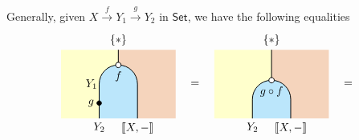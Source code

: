 Generally, given $X\xrightarrow{f}Y_1\xrightarrow{g}Y_2$ in $\mathsf{Set}$, we have the following equalities
\[
 \begin{tikzpicture}[x=0.6cm,y=0.6cm,line width=0.7pt,hollow/.style={
            circle,
            fill=white,
            draw,
            outer sep=0pt,
            inner sep=1.7pt,
            line width=0.7pt
          }]
    \definecolor{leftcolor}{RGB}{255,255,204}
    \definecolor{midcolor}{HTML}{BBE6FB}
    \definecolor{rightcolor}{HTML}{F5D4BC}

    \node at (4, 1.8) {$=$};
    \node at (12, 1.8) {$=$};
    
    \begin{scope}
        \begin{scope} 
            \clip (-3,0) rectangle (3,3.6);     
            \fill[fill=leftcolor] (-3,0) rectangle (0, 4);  
            \fill[fill=rightcolor] (0,0) rectangle (3, 4);  
            \draw[fill=midcolor, rounded corners=0.6cm, line width=0.7pt] (-1, -2) rectangle (1, 2.8);
        \end{scope}
        \draw (0, 3.6) -- (0,2.8);
        \filldraw [black] (-1,0.8) circle (2pt) node[left=1pt] {$g$};
        \node[below] at (-1, 0) {$Y_2$};
        \node[left=-2pt] at (-1, 1.8) {$Y_1$};
        \node[below] at (1, 0) {$\llbracket X , -\rrbracket$};
        \node[hollow] at (0, 2.8) {};
        \node[below=2pt] at (0, 2.8) {$f$}; 
        \node[above] at (0, 3.6) {$\{*\}$};
    \end{scope}
    
    \begin{scope}[shift={(8,0)}]
        \begin{scope} 
            \clip (-3,0) rectangle (3,3.6);     
            \fill[fill=leftcolor] (-3,0) rectangle (0, 4);  
            \fill[fill=rightcolor] (0,0) rectangle (3, 4);  
            \draw[fill=midcolor, rounded corners=0.6cm, line width=0.7pt] (-1, -2) rectangle (1, 2);
        \end{scope}
        \draw (0, 3.6) -- (0,2);
        \node[below] at (-1, 0) {$Y_2$};
        \node[below] at (1, 0) {$\llbracket X , -\rrbracket$};
        \node[hollow] at (0, 2) {};
        \node[below=2pt] at (0, 2) {$g\circ f$}; 
        \node[above] at (0, 3.6) {$\{*\}$};
    \end{scope}
    

\end{tikzpicture}\]
